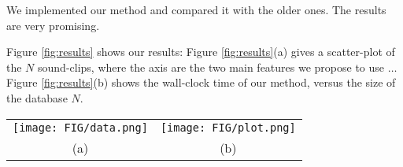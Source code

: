 We implemented our method
and compared it with the older ones.
The results are very promising.

Figure \ref{fig:results} shows our results:
Figure \ref{fig:results}(a) gives a scatter-plot
of the $N$ sound-clips, where the axis are the two main
features we propose to use $\ldots$
Figure \ref{fig:results}(b) shows the wall-clock time
of our method, versus the size of the database $N$.

\begin{figure*}[t]
\begin{center}
\begin{tabular}{cc}
     \texttt{[image: FIG/data.png]} &
     \texttt{[image: FIG/plot.png]} \\
    (a) & (b) 
\end{tabular}
\caption{A fictitious dataset (a) and its performance plot (b)}
\label{fig:results}
\end{center}
\end{figure*}

